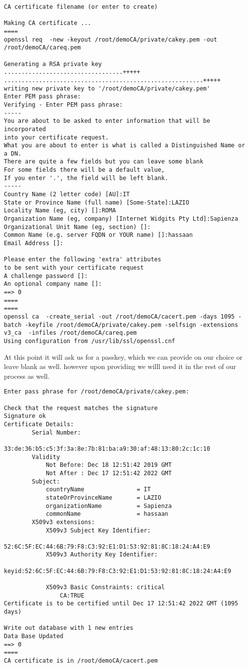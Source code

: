\documentclass[11pt]{article}
\begin{document}
\begin{verbatim}
CA certificate filename (or enter to create)

Making CA certificate ...
====
openssl req  -new -keyout /root/demoCA/private/cakey.pem -out /root/demoCA/careq.pem

Generating a RSA private key
..................................+++++
.........................................................+++++
writing new private key to '/root/demoCA/private/cakey.pem'
Enter PEM pass phrase:
Verifying - Enter PEM pass phrase:
-----
You are about to be asked to enter information that will be incorporated
into your certificate request.
What you are about to enter is what is called a Distinguished Name or a DN.
There are quite a few fields but you can leave some blank
For some fields there will be a default value,
If you enter '.', the field will be left blank.
-----
Country Name (2 letter code) [AU]:IT
State or Province Name (full name) [Some-State]:LAZIO
Locality Name (eg, city) []:ROMA
Organization Name (eg, company) [Internet Widgits Pty Ltd]:Sapienza
Organizational Unit Name (eg, section) []:
Common Name (e.g. server FQDN or YOUR name) []:hassaan
Email Address []:

Please enter the following 'extra' attributes
to be sent with your certificate request
A challenge password []:
An optional company name []:
==> 0
====
====
openssl ca  -create_serial -out /root/demoCA/cacert.pem -days 1095 -batch -keyfile /root/demoCA/private/cakey.pem -selfsign -extensions v3_ca  -infiles /root/demoCA/careq.pem
Using configuration from /usr/lib/ssl/openssl.cnf
\end{verbatim}

At this point it will ask us for a passkey, which we can provide on our choice or leave blank as well. however upon providing we willl need it in the rest of our process as well.

\begin{verbatim}
Enter pass phrase for /root/demoCA/private/cakey.pem:

Check that the request matches the signature
Signature ok
Certificate Details:
        Serial Number:
            33:de:36:b5:c5:3f:3a:8e:7b:81:ba:a9:30:af:48:13:80:2c:1c:10
        Validity
            Not Before: Dec 18 12:51:42 2019 GMT
            Not After : Dec 17 12:51:42 2022 GMT
        Subject:
            countryName               = IT
            stateOrProvinceName       = LAZIO
            organizationName          = Sapienza
            commonName                = hassaan
        X509v3 extensions:
            X509v3 Subject Key Identifier:
                52:6C:5F:EC:44:6B:79:F8:C3:92:E1:D1:53:92:81:8C:18:24:A4:E9
            X509v3 Authority Key Identifier:
                keyid:52:6C:5F:EC:44:6B:79:F8:C3:92:E1:D1:53:92:81:8C:18:24:A4:E9

            X509v3 Basic Constraints: critical
                CA:TRUE
Certificate is to be certified until Dec 17 12:51:42 2022 GMT (1095 days)

Write out database with 1 new entries
Data Base Updated
==> 0
====
CA certificate is in /root/demoCA/cacert.pem

\end{verbatim}
\end{document}
